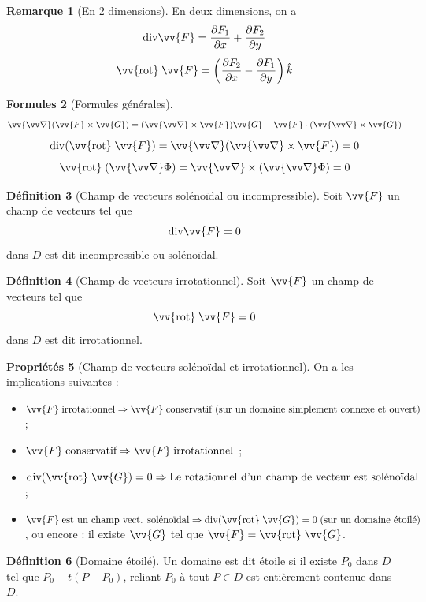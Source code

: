 \documentclass[11pt,a4paper]{article}
\theoremstyle{definition}
\newtheorem{mydef}{Définition}[section]
\newtheorem{myprop}[mydef]{Propriétés}
\newtheorem{myrem}[mydef]{Remarque}
\newtheorem{myform}[mydef]{Formules}
\renewcommand{\div}{\mathrm{div}}
\newcommand{\rot}{\vv{\mathrm{rot}}\;}
\let\oldnabla\nabla
\renewcommand{\nabla}{\vv{\oldnabla}}
\newcommand{\pa}{\partial}
\begin{document}
\begin{myrem}[En 2 dimensions]
En deux dimensions, on a
\[ \div \vv{F} = \frac{\pa F_1}{\pa x} + \frac{\pa F_2}{\pa y} \]
\[ \rot \vv{F} = \left( \frac{\pa F_2}{\pa x} - \frac{\pa F_1}{\pa y} \right) \hat{k} \]
\end{myrem}

\begin{myform}[Formules générales]
\[ \nabla (\vv{F} \times \vv{G}) = (\nabla \times \vv{F})\vv{G} - \vv{F} \cdot (\nabla \times \vv{G}) \]
\[ \div ( \rot \vv{F}) = \nabla (\nabla \times \vv{F}) = 0 \]
\[ \rot (\nabla \Phi) = \nabla \times (\nabla \Phi) = 0 \]
\end{myform}

\begin{mydef}[Champ de vecteurs solénoïdal ou incompressible] Soit $\vv{F}$ un champ de vecteurs tel que
\[ \div \vv{F} = 0 \]
dans $D$ est dit incompressible ou solénoïdal.
\end{mydef}

\begin{mydef}[Champ de vecteurs irrotationnel] Soit $\vv{F}$ un champ de vecteurs tel que
\[ \rot \vv{F} = 0 \]
dans $D$ est dit irrotationnel.
\end{mydef}

\begin{myprop}[Champ de vecteurs solénoïdal et irrotationnel] On a les implications suivantes :
\begin{itemize}
\item $ \vv{F} \; \text{irrotationnel} \Rightarrow \vv{F} \; \text{conservatif (sur un domaine simplement connexe et ouvert)} $ ;
\item $ \vv{F} \;\text{conservatif} \Rightarrow \vv{F} \;\text{irrotationnel} $ ;
\item $ \div (\rot \vv{G}) = 0  \Rightarrow \text{Le rotationnel d'un champ de vecteur est solénoïdal} $ ;
\item $ \vv{F} \;\text{est un champ vect. solénoïdal} \Rightarrow \div (\rot \vv{G}) = 0 \;\text{(sur un domaine étoilé)} $, ou encore : il existe $\vv{G}$ tel que $\vv{F} = \rot \vv{G}$.
\end{itemize}
\end{myprop}

\begin{mydef}[Domaine étoilé] Un domaine est dit étoile si il existe $P_0$ dans $D$ tel que $P_0 + t(P - P_0)$, reliant $P_0$ à tout $P \in D$ est entièrement contenue dans $D$. \end{mydef}
\end{document}
